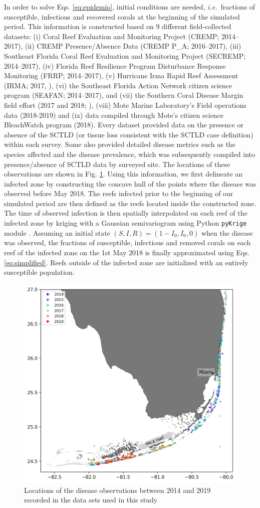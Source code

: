 \documentclass[utf8]{frontiersSCNS}
\newcommand{\ie}{{\it i.e.}\ }
\begin{document}
In order to solve Eqs. \ref{eq:epidemio}, initial conditions are needed, \ie fractions of susceptible, infectious and recovered corals at the beginning of the simulated period. This information is constructed based on 9 different field-collected datasets: (i) Coral Reef Evaluation and Monitoring Project (CREMP; 2014–2017), (ii) CREMP Presence/Absence Data (CREMP P\_A; 2016–2017), (iii) Southeast Florida Coral Reef Evaluation and Monitoring Project (SECREMP; 2014–2017), (iv) Florida Reef Resilience Program Disturbance Response Monitoring (FRRP; 2014–2017), (v) Hurricane Irma Rapid Reef Assessment (IRMA; 2017, \cite{viehman2018}), (vi) the Southeast Florida Action Network citizen science program (SEAFAN; 2014–2017), and (vii) the Southern Coral Disease Margin field effort (2017 and 2018; \cite{neely2018surveying}), (viii) Mote Marine Laboratory’s Field operations data (2018-2019) and (ix) data compiled through Mote’s citizen science BleachWatch program (2018). Every dataset provided data on the presence or absence of the SCTLD (or tissue loss consistent with the SCTLD case definition) within each survey. Some also provided detailed disease metrics such as the species affected and the disease prevalence, which was subsequently compiled into presence/absence of SCTLD data by surveyed site. The locations of these observations are shown in Fig. \ref{fig:stns}. Using this information, we first delineate an infected zone by constructing the concave hull of the points where the disease was observed before May 2018. The reefs infected prior to the beginning of our simulated period are then defined as the reefs located inside the constructed zone. The time of observed infection is then spatially interpolated on each reef of the infected zone by kriging with a Gaussian semivariogram using Python \texttt{pyKrige} module \citep{murphy2014pykrige}. Assuming an initial state $(S,I,R)=(1-I_0, I_0, 0)$ when the disease was observed, the fractions of susceptible, infectious and removed corals on each reef of the infected zone on the 1st May 2018 is finally approximated using Eqs. \ref{eq:simplified}. Reefs outside of the infected zone are initialized with an entirely susceptible population.  

\begin{figure}
    \center
    \includegraphics[width=.6\textwidth]{figures/monitoring.png}
    \caption{Locations of the disease observations between 2014 and 2019 recorded in the data sets used in this study}
    \label{fig:stns}
\end{figure}
\end{document}
